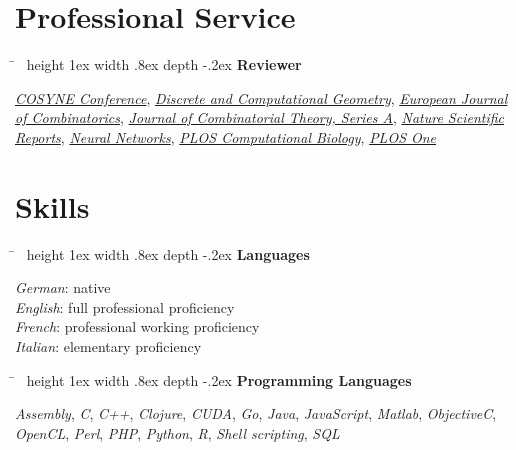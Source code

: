 \documentclass[10pt]{article} %
\newlength{\smallertextwidth}
\newcommand{\sqbullet}{~\vrule height 1ex width .8ex depth -.2ex} %
\newcommand{\skillgroup}[2]{
\begin{tabbing}
\hspace{5mm} \= \kill
\sqbullet \>\+ \textbf{#1}\\
\begin{minipage}{\smallertextwidth}
\vspace{5pt}
#2
\end{minipage}
\end{tabbing}
}
\begin{document}

\vspace*{-2mm}
\section{Professional Service}
%
\skillgroup{Reviewer}
{
\textit{\href{http://www.cosyne.org}{COSYNE Conference}},
\textit{\href{https://link.springer.com/journal/454}{Discrete and Computational Geometry}},
\textit{\href{https://www.journals.elsevier.com/european-journal-of-combinatorics}{European Journal of Combinatorics}},
\textit{\href{https://www.journals.elsevier.com/journal-of-combinatorial-theory-series-a}{Journal of Combinatorial Theory, Series A}},
\textit{\href{https://www.nature.com/srep/}{Nature Scientific Reports}},
\textit{\href{https://www.journals.elsevier.com/neural-networks}{Neural Networks}},
\textit{\href{https://journals.plos.org/ploscompbiol/}{PLOS Computational Biology}},
\textit{\href{https://journals.plos.org/plosone/}{PLOS One}}
}



\section{Skills}

\skillgroup{Languages}
{
  \textit{German}: native\\
  \textit{English}: full professional proficiency\\
  \textit{French}: professional working proficiency\\
  \textit{Italian}: elementary proficiency\\
}



\skillgroup{Programming Languages}
{
\textit{Assembly}, \textit{C}, \textit{C++},
\textit{Clojure},
\textit{CUDA},
\textit{Go},
\textit{Java},
\textit{JavaScript},
\textit{Matlab},
\textit{ObjectiveC},
\textit{OpenCL},
\textit{Perl},
\textit{PHP},
\textit{Python},
\textit{R},
\textit{Shell scripting},
\textit{SQL}
}
\end{document}
